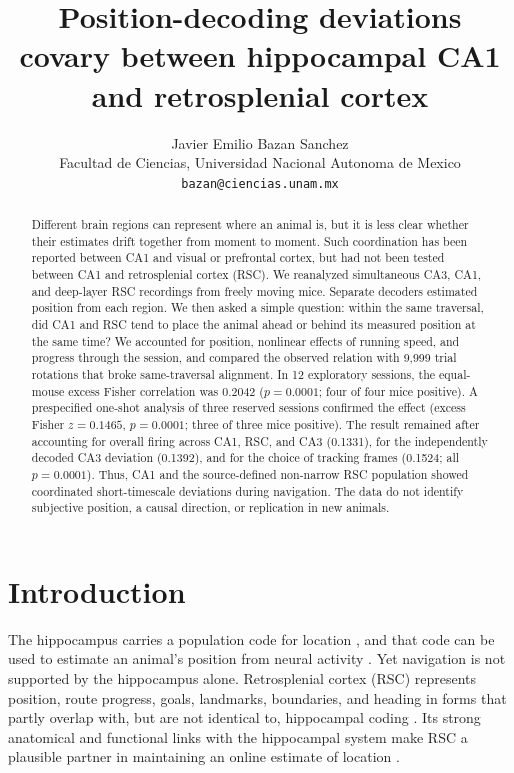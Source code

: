 \documentclass[10pt,twocolumn]{article}
\title{Position-decoding deviations covary between hippocampal CA1 and retrosplenial cortex}
\author{Javier Emilio Bazan Sanchez\\
\small Facultad de Ciencias, Universidad Nacional Autonoma de Mexico\\
\small \texttt{bazan@ciencias.unam.mx}}
\date{}
\begin{document}
\maketitle

\begin{abstract}
Different brain regions can represent where an animal is, but it is less clear whether their estimates drift together from moment to moment. Such coordination has been reported between CA1 and visual or prefrontal cortex, but had not been tested between CA1 and retrosplenial cortex (RSC). We reanalyzed simultaneous CA3, CA1, and deep-layer RSC recordings from freely moving mice. Separate decoders estimated position from each region. We then asked a simple question: within the same traversal, did CA1 and RSC tend to place the animal ahead or behind its measured position at the same time? We accounted for position, nonlinear effects of running speed, and progress through the session, and compared the observed relation with 9,999 trial rotations that broke same-traversal alignment. In 12 exploratory sessions, the equal-mouse excess Fisher correlation was 0.2042 ($p=0.0001$; four of four mice positive). A prespecified one-shot analysis of three reserved sessions confirmed the effect (excess Fisher $z=0.1465$, $p=0.0001$; three of three mice positive). The result remained after accounting for overall firing across CA1, RSC, and CA3 (0.1331), for the independently decoded CA3 deviation (0.1392), and for the choice of tracking frames (0.1524; all $p=0.0001$). Thus, CA1 and the source-defined non-narrow RSC population showed coordinated short-timescale deviations during navigation. The data do not identify subjective position, a causal direction, or replication in new animals.
\end{abstract}

\section{Introduction}

The hippocampus carries a population code for location \citep{okeefe1971,wilson1993}, and that code can be used to estimate an animal's position from neural activity \citep{zhang1998}. Yet navigation is not supported by the hippocampus alone. Retrosplenial cortex (RSC) represents position, route progress, goals, landmarks, boundaries, and heading in forms that partly overlap with, but are not identical to, hippocampal coding \citep{alexander2015,mao2017,miller2019,fischer2020,alexander2020,sit2023,subramanian2024}. Its strong anatomical and functional links with the hippocampal system make RSC a plausible partner in maintaining an online estimate of location \citep{sugar2011,cooper2001,mao2018}.
\end{document}
